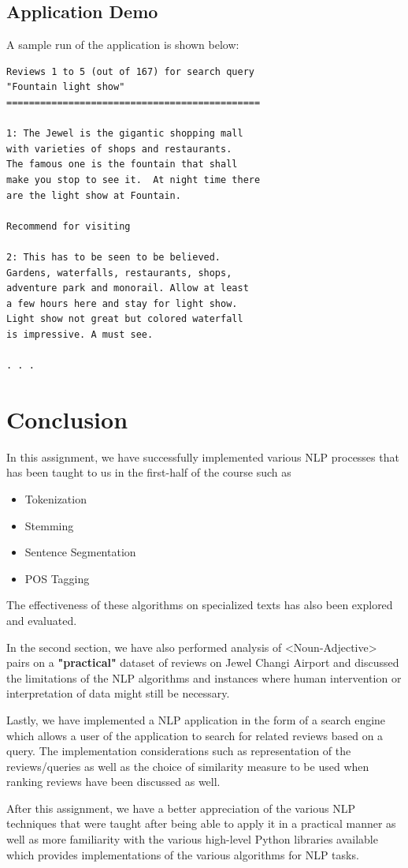 \documentclass[sigconf,nonacm=true]{acmart}
\begin{document}
\subsection{Application Demo}
A sample run of the application is shown below:
\begin{lstlisting}
Reviews 1 to 5 (out of 167) for search query 
"Fountain light show"
=============================================

1: The Jewel is the gigantic shopping mall 
with varieties of shops and restaurants. 
The famous one is the fountain that shall 
make you stop to see it.  At night time there
are the light show at Fountain.

Recommend for visiting

2: This has to be seen to be believed. 
Gardens, waterfalls, restaurants, shops, 
adventure park and monorail. Allow at least 
a few hours here and stay for light show. 
Light show not great but colored waterfall 
is impressive. A must see.

. . .
\end{lstlisting}

\newpage
\section{Conclusion}
In this assignment, we have successfully implemented various NLP processes that has been taught to us in the first-half of the course such as
\begin{itemize}
	\item Tokenization
	\item Stemming
	\item Sentence Segmentation
	\item POS Tagging
\end{itemize}
The effectiveness of these algorithms on specialized texts has also been explored and evaluated.

In the second section, we have also performed analysis of <Noun-Adjective> pairs on a \textbf{"practical"} dataset of reviews on Jewel Changi Airport and discussed the limitations of the NLP algorithms and instances where human intervention or interpretation of data might still be necessary. 

Lastly, we have implemented a NLP application in the form of a search engine which allows a user of the application to search for related reviews based on a query. The implementation considerations such as representation of the reviews/queries as well as the choice of similarity measure to be used when ranking reviews have been discussed as well.

After this assignment, we have a better appreciation of the various NLP techniques that were taught after being able to apply it in a practical manner as well as more familiarity with the various high-level Python libraries available which provides implementations of the various algorithms for NLP tasks.
\end{document}
